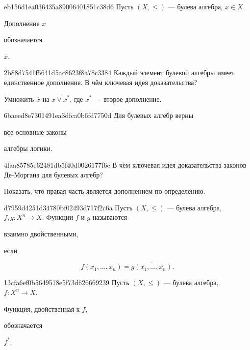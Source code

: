 \begin{note}{eb156d1ea036435a89006401851c38d6}
    Пусть \({ (X, \leqslant) }\) --- булева алгебра,\: \({ x \in X }\).
    \begin{icloze}{2}Дополнение \({ x }\)\end{icloze} обозначается \begin{icloze}{1}\({ \overline{x} }\).\end{icloze}
\end{note}

\begin{note}{2b88d7541f5641d5ac8623f8a78c3384}
    Каждый элемент булевой алгебры имеет единственное дополнение.
    В чём ключевая идея доказательства?

    \begin{cloze}{1}
        Умножить \({ \overline{x} }\) на \({ x \lor x^* }\), где \({ x^* }\) --- второе дополнение.
    \end{cloze}
\end{note}

\begin{note}{6baeed8e7301491ea3dfca0b6fd7750d}
    Для булевых алгебр верны \begin{icloze}{1}все основные законы\end{icloze} алгебры логики.
\end{note}

\begin{note}{4faa85785e62481db5f40d0026177f6e}
    В чём ключевая идея доказательства законов Де-Моргана для булевых алгебр?

    \begin{cloze}{1}
        Показать, что правая часть является дополнением по определению.
    \end{cloze}
\end{note}

\begin{note}{d7959d4251d34780bf02493d717f2c6a}
    Пусть \({ (X, \leqslant) }\) --- булева алгебра,\: \({ f, g : X^{n} \to X }\).
    Функции \({ f }\) и \({ g }\) называются \begin{icloze}{2}взаимно двойственными,\end{icloze} если
    \begin{icloze}{1}
        \[
            f(x_1, \ldots, x_n) = \overline{g(\overline{x_1}, \ldots, \overline{x_n})}.
        \]
    \end{icloze}
\end{note}

\begin{note}{13cfa6ef0b5649518e5f73d626669239}
    Пусть \({ (X, \leqslant) }\) --- булева алгебра, \({ f : X^{n} \to X }\).
    \begin{icloze}{2}Функция, двойственная к \({ f }\),\end{icloze} обозначается \begin{icloze}{1}\({ f^* }\).\end{icloze}
\end{note}

